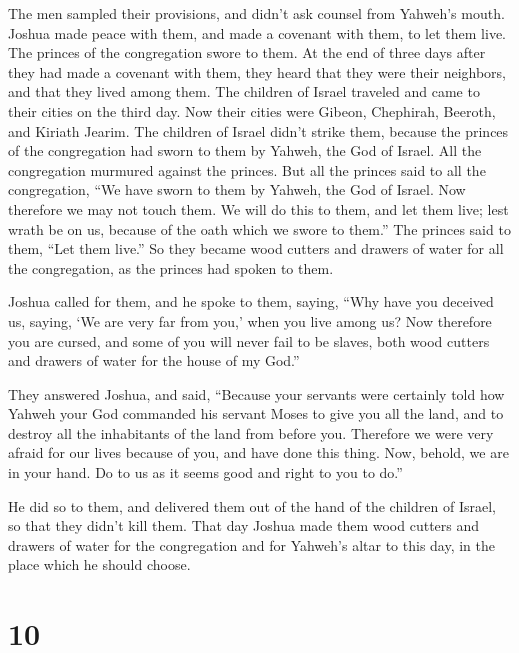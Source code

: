  The men sampled their provisions, and didn't ask counsel
from Yahweh's mouth.  Joshua made peace with them, and
made a covenant with them, to let them live. The princes of the
congregation swore to them.  At the end of three days
after they had made a covenant with them, they heard that they were
their neighbors, and that they lived among them.  The
children of Israel traveled and came to their cities on the third day.
Now their cities were Gibeon, Chephirah, Beeroth, and Kiriath Jearim.
 The children of Israel didn't strike them, because the
princes of the congregation had sworn to them by Yahweh, the God of
Israel. All the congregation murmured against the princes.
 But all the princes said to all the congregation, ``We
have sworn to them by Yahweh, the God of Israel. Now therefore we may
not touch them.  We will do this to them, and let them
live; lest wrath be on us, because of the oath which we swore to them.''
 The princes said to them, ``Let them live.'' So they
became wood cutters and drawers of water for all the congregation, as
the princes had spoken to them.

 Joshua called for them, and he spoke to them, saying,
``Why have you deceived us, saying, `We are very far from you,' when you
live among us?  Now therefore you are cursed, and some of
you will never fail to be slaves, both wood cutters and drawers of water
for the house of my God.''

 They answered Joshua, and said, ``Because your servants
were certainly told how Yahweh your God commanded his servant Moses to
give you all the land, and to destroy all the inhabitants of the land
from before you. Therefore we were very afraid for our lives because of
you, and have done this thing.  Now, behold, we are in
your hand. Do to us as it seems good and right to you to do.''

 He did so to them, and delivered them out of the hand of
the children of Israel, so that they didn't kill them. 
That day Joshua made them wood cutters and drawers of water for the
congregation and for Yahweh's altar to this day, in the place which he
should choose.

\hypertarget{section-9}{%
\section{10}\label{section-9}}

